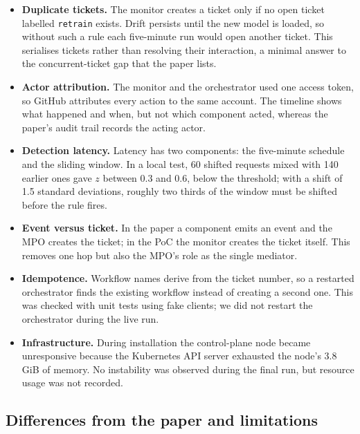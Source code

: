 \documentclass[11pt,a4paper]{article}
\begin{document}
\begin{itemize}
  \item \textbf{Duplicate tickets.} The monitor creates a ticket only if no open ticket labelled \texttt{retrain} exists. Drift persists until the new model is loaded, so without such a rule each five-minute run would open another ticket. This serialises tickets rather than resolving their interaction, a minimal answer to the concurrent-ticket gap that the paper lists.
  \item \textbf{Actor attribution.} The monitor and the orchestrator used one access token, so GitHub attributes every action to the same account. The timeline shows what happened and when, but not which component acted, whereas the paper's audit trail records the acting actor.
  \item \textbf{Detection latency.} Latency has two components: the five-minute schedule and the sliding window. In a local test, 60 shifted requests mixed with 140 earlier ones gave $z$ between 0.3 and 0.6, below the threshold; with a shift of 1.5 standard deviations, roughly two thirds of the window must be shifted before the rule fires.
  \item \textbf{Event versus ticket.} In the paper a component emits an event and the MPO creates the ticket; in the PoC the monitor creates the ticket itself. This removes one hop but also the MPO's role as the single mediator.
  \item \textbf{Idempotence.} Workflow names derive from the ticket number, so a restarted orchestrator finds the existing workflow instead of creating a second one. This was checked with unit tests using fake clients; we did not restart the orchestrator during the live run.
  \item \textbf{Infrastructure.} During installation the control-plane node became unresponsive because the Kubernetes API server exhausted the node's 3.8\,GiB of memory. No instability was observed during the final run, but resource usage was not recorded.
\end{itemize}

\subsection{Differences from the paper and limitations}
\label{sec:poc-diff}
\end{document}
